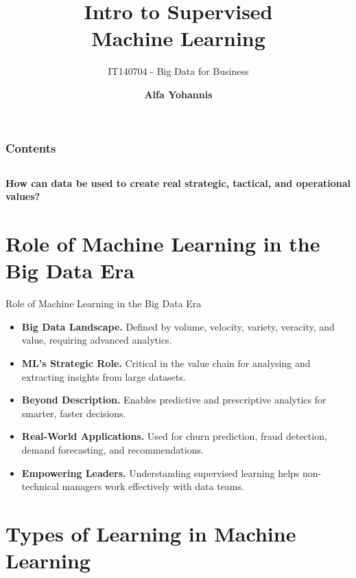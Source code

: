 \documentclass[aspectratio=169, table]{beamer}
\title{\Huge Intro to Supervised \\
\vspace{10pt}
Machine Learning}
\subtitle{IT140704 - Big Data for Business}
\author{\textbf{Alfa Yohannis}}
\begin{document}
\frame{\titlepage}


\begin{frame}[fragile]
\frametitle{Contents}
\vspace{20pt}
\begin{columns}[t]
	\tableofcontents[sections={1-5}]
	
	\tableofcontents[sections={6-20}]
\end{columns}
\end{frame}

\begin{frame}{\hfill}
	\centering
	\Huge{\textbf{How can data be used to create real strategic, tactical, and operational values?}}
\end{frame}


\section{Role of Machine Learning in the Big Data Era}

\begin{frame}{Role of Machine Learning in the Big Data Era}
	\vspace{20pt}
	\begin{itemize}
		\item \textbf{Big Data Landscape.} Defined by volume, velocity, variety, veracity, and value, requiring advanced analytics.
		\item \textbf{ML's Strategic Role.} Critical in the value chain for analysing and extracting insights from large datasets.
		\item \textbf{Beyond Description.} Enables predictive and prescriptive analytics for smarter, faster decisions.
		\item \textbf{Real-World Applications.} Used for churn prediction, fraud detection, demand forecasting, and recommendations.
		\item \textbf{Empowering Leaders.} Understanding supervised learning helps non-technical managers work effectively with data teams.
	\end{itemize}
\end{frame}

\section{Types of Learning in Machine Learning}
\end{document}
